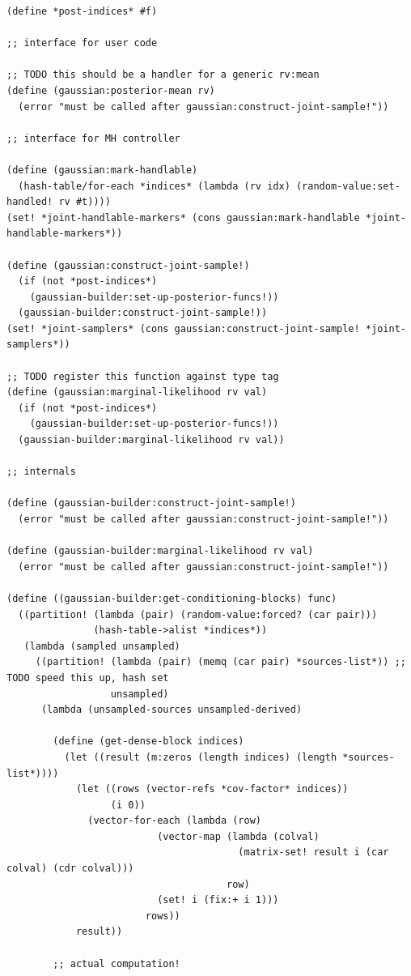 \documentclass{article}
\begin{document}
\begin{verbatim}
(define *post-indices* #f)

;; interface for user code

;; TODO this should be a handler for a generic rv:mean
(define (gaussian:posterior-mean rv)
  (error "must be called after gaussian:construct-joint-sample!"))

;; interface for MH controller

(define (gaussian:mark-handlable)
  (hash-table/for-each *indices* (lambda (rv idx) (random-value:set-handled! rv #t))))
(set! *joint-handlable-markers* (cons gaussian:mark-handlable *joint-handlable-markers*))

(define (gaussian:construct-joint-sample!)
  (if (not *post-indices*)
    (gaussian-builder:set-up-posterior-funcs!))
  (gaussian-builder:construct-joint-sample!))
(set! *joint-samplers* (cons gaussian:construct-joint-sample! *joint-samplers*))

;; TODO register this function against type tag
(define (gaussian:marginal-likelihood rv val)
  (if (not *post-indices*)
    (gaussian-builder:set-up-posterior-funcs!))
  (gaussian-builder:marginal-likelihood rv val))

;; internals

(define (gaussian-builder:construct-joint-sample!)
  (error "must be called after gaussian:construct-joint-sample!"))

(define (gaussian-builder:marginal-likelihood rv val)
  (error "must be called after gaussian:construct-joint-sample!"))

(define ((gaussian-builder:get-conditioning-blocks) func)
  ((partition! (lambda (pair) (random-value:forced? (car pair)))
               (hash-table->alist *indices*))
   (lambda (sampled unsampled)
     ((partition! (lambda (pair) (memq (car pair) *sources-list*)) ;; TODO speed this up, hash set
                  unsampled)
      (lambda (unsampled-sources unsampled-derived)

        (define (get-dense-block indices)
          (let ((result (m:zeros (length indices) (length *sources-list*))))
            (let ((rows (vector-refs *cov-factor* indices))
                  (i 0))
              (vector-for-each (lambda (row)
                          (vector-map (lambda (colval)
                                        (matrix-set! result i (car colval) (cdr colval)))
                                      row)
                          (set! i (fix:+ i 1)))
                        rows))
            result))

        ;; actual computation!


\end{verbatim}
\end{document}
